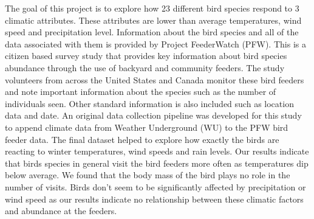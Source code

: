 The goal of this project is to explore how 23 different bird species respond to 3 climatic attributes. These attributes are lower than average temperatures, wind speed and precipitation level. Information about the bird species and all of the data associated with them is provided by Project FeederWatch (PFW). This is a citizen based survey study that provides key information about bird species abundance through the use of backyard and community feeders. The study volunteers from across the United States and Canada monitor these bird feeders and note important information about the species such as the number of individuals seen. Other standard information is also included such as location data and date. An original data collection pipeline was developed for this study to append climate data from Weather Underground (WU) to the PFW bird feeder data. The final dataset helped to explore how exactly the birds are reacting to winter temperatures, wind speeds and rain levels. Our results indicate that birds species in general visit the bird feeders more often as temperatures dip below average. We found that the body mass of the bird plays no role in the number of visits. Birds don't seem to be significantly affected by precipitation or wind speed as our results indicate no relationship between these climatic factors and abundance at the feeders.  